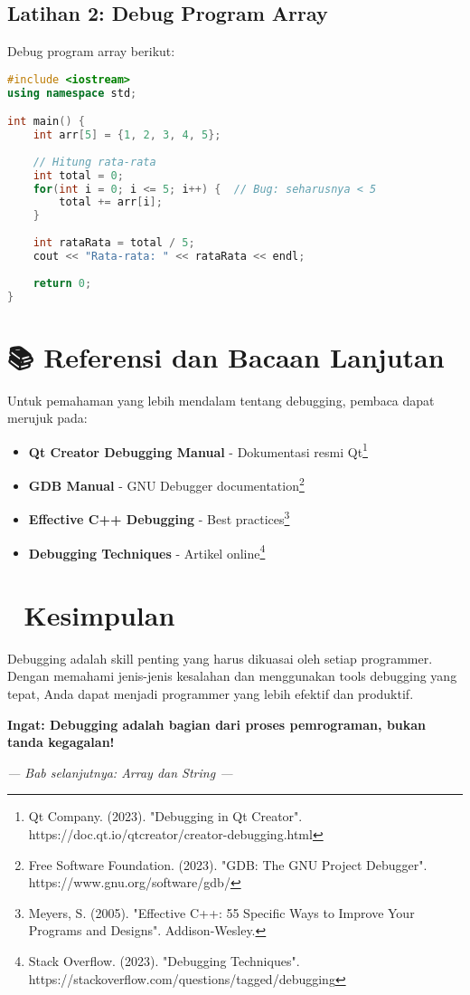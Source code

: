 \subsection{Latihan 2: Debug Program Array}

Debug program array berikut:

\begin{lstlisting}[language=c++, caption=Program Array dengan Bug]
#include <iostream>
using namespace std;

int main() {
    int arr[5] = {1, 2, 3, 4, 5};
    
    // Hitung rata-rata
    int total = 0;
    for(int i = 0; i <= 5; i++) {  // Bug: seharusnya < 5
        total += arr[i];
    }
    
    int rataRata = total / 5;
    cout << "Rata-rata: " << rataRata << endl;
    
    return 0;
}
\end{lstlisting}

\section{📚 Referensi dan Bacaan Lanjutan}

Untuk pemahaman yang lebih mendalam tentang debugging, pembaca dapat merujuk pada:

\begin{itemize}
\item \textbf{Qt Creator Debugging Manual} - Dokumentasi resmi Qt\footnote{Qt Company. (2023). "Debugging in Qt Creator". https://doc.qt.io/qtcreator/creator-debugging.html}
\item \textbf{GDB Manual} - GNU Debugger documentation\footnote{Free Software Foundation. (2023). "GDB: The GNU Project Debugger". https://www.gnu.org/software/gdb/}
\item \textbf{Effective C++ Debugging} - Best practices\footnote{Meyers, S. (2005). "Effective C++: 55 Specific Ways to Improve Your Programs and Designs". Addison-Wesley.}
\item \textbf{Debugging Techniques} - Artikel online\footnote{Stack Overflow. (2023). "Debugging Techniques". https://stackoverflow.com/questions/tagged/debugging}
\end{itemize}

\section{🎉 Kesimpulan}

Debugging adalah skill penting yang harus dikuasai oleh setiap programmer. Dengan memahami jenis-jenis kesalahan dan menggunakan tools debugging yang tepat, Anda dapat menjadi programmer yang lebih efektif dan produktif.

\begin{center}
\textbf{Ingat: Debugging adalah bagian dari proses pemrograman, bukan tanda kegagalan!} 🐛✨
\end{center}

\vspace{1cm}

\begin{center}
\textit{--- Bab selanjutnya: Array dan String ---}
\end{center} 